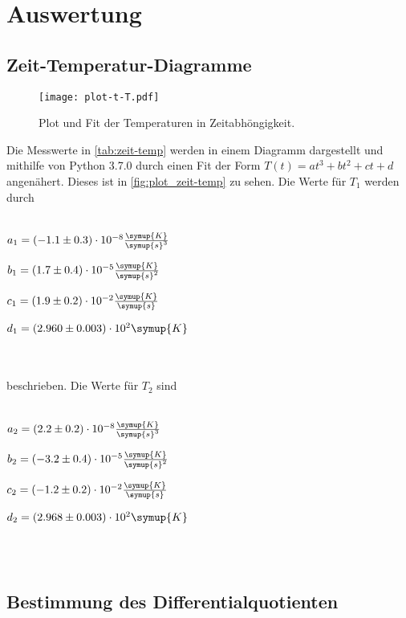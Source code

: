 \section{Auswertung}
\label{sec:Auswertung}
\subsection{Zeit-Temperatur-Diagramme}



\begin{figure}
  \centering
  \texttt{[image: plot-t-T.pdf]}
  \caption{Plot und Fit der Temperaturen in Zeitabhöngigkeit.}
  \label{fig:plot_zeit-temp}
\end{figure}

Die Messwerte in \autoref{tab:zeit-temp} werden in einem Diagramm dargestellt und mithilfe von Python 3.7.0 durch einen Fit der Form $T(t) = at^3 + bt^2 + ct + d$ angenähert.
Dieses ist in \autoref{fig:plot_zeit-temp} zu sehen. Die Werte für $T_1$ werden durch
\\ \\
\centerline{$a_1 = (-1.1 \pm 0.3 ) \cdot 10^\text{$-8$} \frac{\symup{K}}{\symup{s}^3}$}
\centerline{$b_1 = ( 1.7 \pm 0.4 ) \cdot 10^\text{$-5$} \frac{\symup{K}}{\symup{s}^2}$}
\centerline{$c_1 = ( 1.9 \pm 0.2 ) \cdot 10^\text{$-2$} \frac{\symup{K}}{\symup{s}}$}
\centerline{$d_1 = ( 2.960 \pm 0.003 ) \cdot 10^\text{$2$} \symup{K}$}
\\ \\
beschrieben. Die Werte für $T_2$ sind
\\ \\
\centerline{$a_2 = ( 2.2 \pm 0.2 ) \cdot 10^\text{$-8$} \frac{\symup{K}}{\symup{s}^3}$}
\centerline{$b_2 = (-3.2 \pm 0.4 ) \cdot 10^\text{$-5$} \frac{\symup{K}}{\symup{s}^2}$}
\centerline{$c_2 = (-1.2 \pm 0.2 ) \cdot 10^\text{$-2$} \frac{\symup{K}}{\symup{s}}$}
\centerline{$d_2 = ( 2.968 \pm 0.003 ) \cdot 10^\text{$2$} \symup{K}$}
\\ \\

\subsection{Bestimmung des Differentialquotienten}

